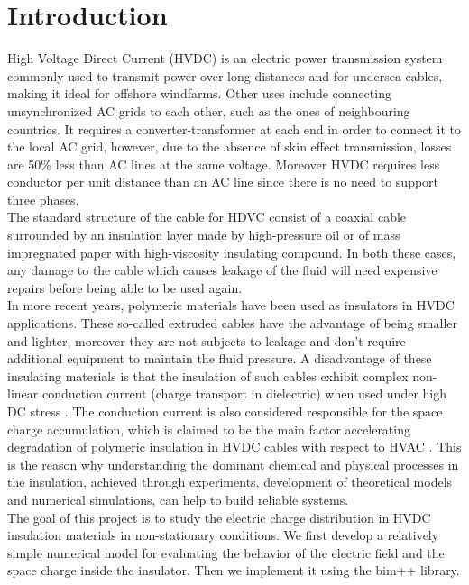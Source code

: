 \documentclass{Configuration_Files/PoliMi3i_thesis}
\begin{document}

\chapter*{Introduction}
High Voltage Direct Current (HVDC) is an electric power transmission system commonly used to transmit power over long distances and for undersea cables, making it ideal for offshore windfarms. Other uses include connecting unsynchronized AC grids to each other, such as the ones of neighbouring countries. It requires a converter-transformer at each end in order to connect it to the local AC grid, however, due to the absence of skin effect transmission, losses are 50\% less than AC lines at the same voltage. Moreover HVDC requires less conductor per unit distance than an AC line since there is no need to support three phases. 
\\The standard structure of the cable for HDVC consist of a coaxial cable surrounded by an insulation layer made by high-pressure oil or of mass impregnated paper with high-viscosity insulating compound.\cite{reportEU} In both these cases, any damage to the cable which causes leakage of the fluid will need expensive repairs before being able to be used again. 
\\In more recent years, polymeric materials have been used as insulators in HVDC applications. These so-called extruded cables have the advantage of being smaller and lighter, moreover they are not subjects to leakage and don't require additional equipment to maintain the fluid pressure. A disadvantage of these insulating materials is that the insulation of such cables exhibit complex non-linear conduction current (charge transport in dielectric) when used under high DC stress \cite{cable}. The conduction current is also considered responsible for the space charge accumulation, which is claimed to be the main factor accelerating degradation of polymeric insulation in HVDC cables with respect to HVAC \cite{cable2}. This is the reason why understanding the dominant chemical and physical processes in the insulation, achieved through experiments, development of theoretical models and numerical simulations, can help to build reliable systems.
\\The goal of this project is to study the electric charge distribution in HVDC insulation materials in non-stationary conditions. We first develop a relatively simple numerical model for evaluating the behavior of the electric field and the space charge inside the insulator. Then we implement it using the bim++ library.
\end{document}

